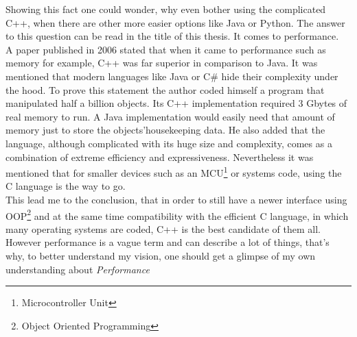 Showing this fact one could wonder, why even bother using the complicated C++, when there are other more easier options like Java or Python. The answer to this question can be read in the title of this thesis. It comes to performance.\\
A paper published in 2006 stated that when it came to performance such as memory for example, C++ was far superior in comparison to Java. It was mentioned that modern languages like Java or C\# hide their complexity under the hood. To prove this statement the author coded himself \dq a program that manipulated half a billion objects. Its C++ implementation required 3 Gbytes of real memory to run. A Java implementation would easily need that amount of memory just to store the objects'housekeeping data\dq{}. He also added that the language, although complicated with its huge size and complexity, comes as a combination of \dq extreme efficiency and expressiveness\dq{}. Nevertheless it was mentioned that for smaller devices such as an MCU\footnote{Microcontroller Unit} or systems code, using the C language is the way to go\cite{1657941}.\\
This lead me to the conclusion, that in order to still have a newer interface using OOP\footnote{Object Oriented Programming} and at the same time compatibility with the efficient C language, in which many operating systems are coded, C++ is the best candidate of them all. However performance is a vague term and can describe a lot of things, that's why, to better understand my vision, one should get a glimpse of my own understanding about \textit{Performance} 
